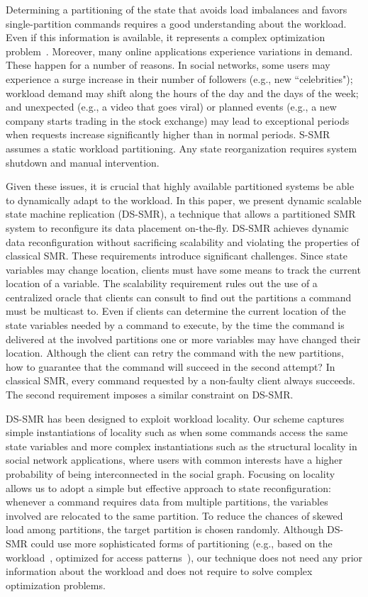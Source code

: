 Determining a partitioning of the state that avoids load imbalances and favors single-partition commands requires a good understanding about the workload. 
Even if this information is available, it represents a complex optimization problem~\cite{curino2010sch,taft2014est}.
Moreover, many online applications experience variations in demand. 
These happen for a number of reasons. 
In social networks, some users may experience a surge increase in their number of followers (e.g., new ``celebrities");
workload demand may shift along the hours of the day and the days of the week; and unexpected (e.g., a video that goes viral) or planned events (e.g., a new company starts trading in the stock exchange) may lead to exceptional periods when requests increase significantly higher than in normal periods.
S-SMR assumes a static workload partitioning.
Any state reorganization requires system shutdown and manual intervention.

Given these issues, it is crucial that highly available partitioned systems be able to dynamically adapt to the workload.
In this paper, we present dynamic scalable state machine replication (DS-SMR), a technique that allows a partitioned SMR system to reconfigure its data placement on-the-fly.
DS-SMR achieves dynamic data reconfiguration without sacrificing scalability and violating the properties of classical SMR.
These requirements introduce significant challenges.
Since state variables may change location, clients must have some means to track the current location of a variable.
The scalability requirement rules out the use of a centralized oracle that clients can consult to find out the partitions a command must be multicast to.
Even if clients can determine the current location of the state variables needed by a command to execute, by the time the command is delivered at the involved partitions one or more variables may have changed their location.
Although the client can retry the command with the new partitions, how to guarantee that the command will succeed in the second attempt?
In classical SMR, every command requested by a non-faulty client always succeeds.
The second requirement imposes a similar constraint on DS-SMR.

DS-SMR has been designed to exploit workload locality.
Our scheme captures simple instantiations of locality such as when some commands access the same state variables and more complex instantiations such as the structural locality in social network applications, where users with common interests have a higher probability of being interconnected in the social graph.
Focusing on locality allows us to adopt a simple but effective approach to state reconfiguration: whenever a command requires data from multiple partitions, the variables involved are relocated to the same partition.
To reduce the chances of skewed load among partitions, the target partition is chosen randomly.
Although DS-SMR could use more sophisticated forms of partitioning (e.g., based on the workload~\cite{curino2010sch}, optimized for access patterns~\cite{taft2014est}), our technique does not need any prior information about the workload and does not require to solve complex optimization problems.



